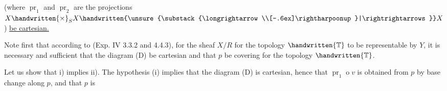 (where $\operatorname{pr}_1$ and $\operatorname{pr}_2$ are the projections $X\handwritten{\times}_S X\handwritten{\unsure{\substack{\longrightarrow\\[-.6ex]\rightharpoonup}|\rightrightarrows}}X$) \uline{be cartesian.}

Note first that according to (Exp. IV 3.3.2 and 4.4.3), for the sheaf $X/R$  for the topology $\handwritten{\mathbb{T}}$ to be representable by $Y$, it is necessary and sufficient that the diagram (D) be cartesian and that $p$ be covering for the topology $\handwritten{\mathbb{T}}$.

Let us show that i) implies ii). The hypothesis (i) implies that the diagram (D) is cartesian, hence that $\operatorname{pr}_1\mathbin{o} v$ is obtained from $p$ by base change along $p$, and that $p$ is
